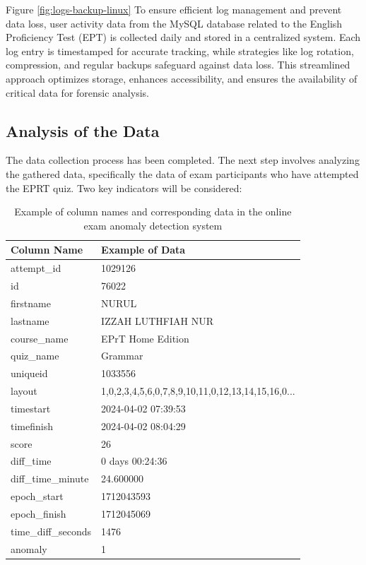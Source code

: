 Figure \ref{fig:logs-backup-linux} To ensure efficient log management and prevent data loss, user activity data from the MySQL database related to the English Proficiency Test (EPT) is collected daily and stored in a centralized system. Each log entry is timestamped for accurate tracking, while strategies like log rotation, compression, and regular backups safeguard against data loss. This streamlined approach optimizes storage, enhances accessibility, and ensures the availability of critical data for forensic analysis.

\subsection{Analysis of the Data}

The data collection process has been completed. The next step involves analyzing the gathered data, specifically the data of exam participants who have attempted the EPRT quiz. Two key indicators will be considered:


\begin{table}[H]
	\centering
	\renewcommand{\arraystretch}{1.3}
	\begin{tabular}{|p{4cm}|p{10cm}|}
		\hline
		\textbf{Column Name} & \textbf{Example of Data} \\
		\hline
		attempt\_id & 1029126 \\
		\hline
		id & 76022 \\
		\hline
		firstname & NURUL \\
		\hline
		lastname & IZZAH LUTHFIAH NUR \\
		\hline
		course\_name & EPrT Home Edition \\
		\hline
		quiz\_name & Grammar \\
		\hline
		uniqueid & 1033556 \\
		\hline
		layout & 1,0,2,3,4,5,6,0,7,8,9,10,11,0,12,13,14,15,16,0... \\
		\hline
		timestart & 2024-04-02 07:39:53 \\
		\hline
		timefinish & 2024-04-02 08:04:29 \\
		\hline
		score & 26 \\
		\hline
		diff\_time & 0 days 00:24:36 \\
		\hline
		diff\_time\_minute & 24.600000 \\
		\hline
		epoch\_start & 1712043593 \\
		\hline
		epoch\_finish & 1712045069 \\
		\hline
		time\_diff\_seconds & 1476 \\
		\hline
		anomaly & 1 \\
		\hline
	\end{tabular}
	\caption{Example of column names and corresponding data in the online exam anomaly detection system}
	\label{tab:anomaly_data}
\end{table}

